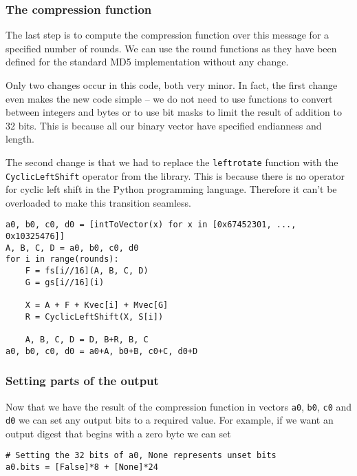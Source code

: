 \subsubsection{The compression function}
The last step is to compute the compression function over this message for a specified number of rounds.
We can use the round functions as they have been defined for the standard MD5 implementation without any change.

Only two changes occur in this code, both very minor.
In fact, the first change even makes the new code simple -- we do not need to use functions to convert between integers and bytes or to use bit masks to limit the result of addition to 32 bits.
This is because all our binary vector have specified endianness and length.

The second change is that we had to replace the \texttt{leftrotate} function with the \texttt{CyclicLeftShift} operator from the library.
This is because there is no operator for cyclic left shift in the Python programming language.
Therefore it can't be overloaded to make this transition seamless.

\begin{verbatim}
a0, b0, c0, d0 = [intToVector(x) for x in [0x67452301, ..., 0x10325476]]
A, B, C, D = a0, b0, c0, d0
for i in range(rounds):
    F = fs[i//16](A, B, C, D)
    G = gs[i//16](i)

    X = A + F + Kvec[i] + Mvec[G]
    R = CyclicLeftShift(X, S[i])

    A, B, C, D = D, B+R, B, C
a0, b0, c0, d0 = a0+A, b0+B, c0+C, d0+D
\end{verbatim}

\subsubsection{Setting parts of the output}
Now that we have the result of the compression function in vectors \texttt{a0}, \texttt{b0}, \texttt{c0} and \texttt{d0} we can set any output bits to a required value.
For example, if we want an output digest that begins with a zero byte we can set

\begin{verbatim}
# Setting the 32 bits of a0, None represents unset bits
a0.bits = [False]*8 + [None]*24
\end{verbatim}

